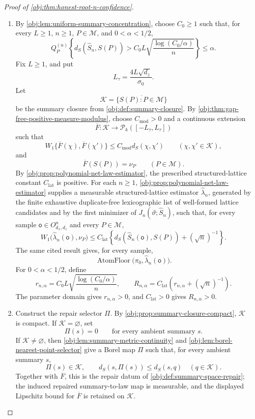 \documentclass[11pt]{article}
\begin{document}
\begin{proof}[Proof of \cref{obj:thm:honest-root-n-confidence}]
\begin{enumerate}
\item By \cref{obj:lem:uniform-summary-concentration}, choose \(C_0\ge1\) such that, for every \(L\ge1\), \(n\ge1\), \(P\in\mathcal M\), and \(0<\alpha<1/2\),
\[
Q_P^{(n)}
\left\{
d_S(\widehat S_n,S(P))>
C_0L\sqrt{\frac{\log(C_0/\alpha)}{n}}
\right\}
\le \alpha .
\]
Fix \(L\ge1\), and put
\[
L_\tau=\frac{4L\sqrt{d_z}}{\sigma_0}.
\]
Let
\[
\mathcal K=\overline{\{S(P):P\in\mathcal M\}}
\]
be the summary closure from \cref{obj:def:summary-closure}.  By \cref{obj:thm:gap-free-positive-measure-modulus}, choose \(C_{\mathrm{mod}}>0\) and a continuous extension
\[
\overline F:\mathcal K\to \mathcal P_k([-L_\tau,L_\tau])
\]
such that
\[
W_1\{\overline F(\chi),\overline F(\chi')\}
\le C_{\mathrm{mod}}d_S(\chi,\chi')
\qquad(\chi,\chi'\in\mathcal K),
\]
and
\[
\overline F(S(P))=\nu_P
\qquad(P\in\mathcal M).
\]
By \cref{obj:prop:polynomial-net-law-estimator}, the prescribed structured-lattice constant \(C_{\mathrm{lat}}\) is positive.  For each \(n\ge1\), \cref{obj:prop:polynomial-net-law-estimator} supplies a measurable structured-lattice estimator \(\widehat\lambda_n\), generated by the finite exhaustive duplicate-free lexicographic list of well-formed lattice candidates and by the first minimizer of \(J_n(\vartheta;\widehat S_n)\), such that, for every sample \(\mathsf o\in O_{d_x,d_z}^{n}\) and every \(P\in\mathcal M\),
\[
W_1\bigl(\widehat\lambda_n(\mathsf o),\nu_P\bigr)
\le
C_{\mathrm{lat}}
\left\{
d_S(\widehat S_n(\mathsf o),S(P))+(\sqrt n)^{-1}
\right\}.
\]
The same cited result gives, for every sample,
\[
\operatorname{AtomFloor}\bigl(\pi_0,\widehat\lambda_n(\mathsf o)\bigr).
\]
For \(0<\alpha<1/2\), define
\[
r_{n,\alpha}
=
C_0L\sqrt{\frac{\log(C_0/\alpha)}{n}},
\qquad
R_{n,\alpha}
=
C_{\mathrm{lat}}\left(r_{n,\alpha}+(\sqrt n)^{-1}\right).
\]
The parameter domain gives \(r_{n,\alpha}>0\), and \(C_{\mathrm{lat}}>0\) gives \(R_{n,\alpha}>0\).  %

\item Construct the repair selector \(\Pi\).  By \cref{obj:prop:summary-closure-compact}, \(\mathcal K\) is compact.  If \(\mathcal K=\varnothing\), set
\[
\Pi(s)=0
\qquad\text{for every ambient summary }s.
\]
If \(\mathcal K\ne\varnothing\), then \cref{obj:lem:summary-metric-continuity} and \cref{obj:lem:borel-nearest-point-selector} give a Borel map \(\Pi\) such that, for every ambient summary \(s\),
\[
\Pi(s)\in\mathcal K,
\qquad
d_S(s,\Pi(s))\le d_S(s,q)\quad(q\in\mathcal K).
\]
Together with \(\overline F\), this is the repair datum of \cref{obj:def:summary-space-repair}; the induced repaired summary-to-law map is measurable, and the displayed Lipschitz bound for \(\overline F\) is retained on \(\mathcal K\).  %


\end{enumerate}
\end{proof}
\end{document}
